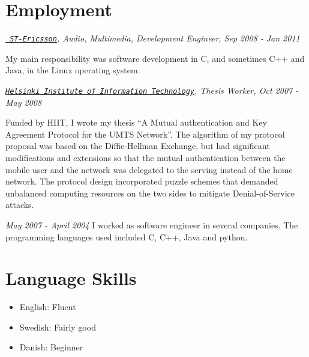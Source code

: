 \documentclass[10pt,letterpaper]{article}
\newenvironment{aperiod}{
  \begin{list}{}{
    \setlength{\leftmargin}{1.5em}
    \setlength{\itemsep}{1em}
    \setlength{\parskip}{0pt}
    \setlength{\parsep}{0.25em}
  }
}{
  \end{list}
}
\begin{document}
\section*{Employment}
\begin{aperiod}
\item {\it \href{http://www.stericsson.com}{\tt
      ST-Ericsson}, Audio, Multimedia, Development Engineer, Sep 2008
    - Jan 2011}

  My main responsibility was software development in C, and sometimes
  C++ and Java, in the Linux operating system.

\item {\it \href{http://www.hiit.fi}{\tt Helsinki
      Institute of Information Technology}, Thesis Worker, Oct 2007 -
    May 2008}

  Funded by HIIT, I wrote my thesis ``A Mutual authentication and Key
  Agreement Protocol for the UMTS Network''. The algorithm of my
  protocol proposal was based on the Diffie-Hellman Exchange, but had
  significant modifications and extensions so that the mutual
  authentication between the mobile user and the network was delegated
  to the serving instead of the home network. The protocol design
  incorporated puzzle schemes that demanded unbalanced computing
  resources on the two sides to mitigate Denial-of-Service attacks.

\item {\it May 2007 - April 2004}
  I worked as software engineer in several companies. The programming
  languages used included C, C++, Java and python.
\end{aperiod}

\section*{Language Skills}
\begin{itemize}
\item English: Fluent
\item Swedish: Fairly good
\item Danish: Beginner
\end{itemize}





\end{document}
